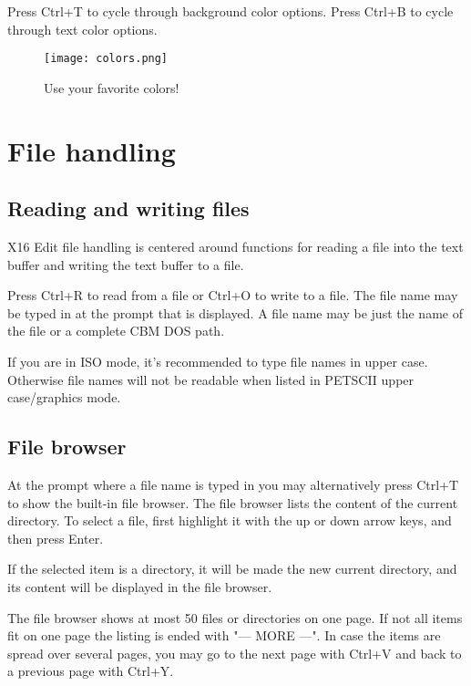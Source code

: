 \documentclass{article}
\begin{document}
        Press Ctrl+T to cycle through background color options.
        Press Ctrl+B to cycle through text color options.

        \begin{figure}[H]
            \caption{Use your favorite colors!}
            \centering\texttt{[image: colors.png]}
        \end{figure}
       
\section{File handling}

    \subsection{Reading and writing files}

    X16 Edit file handling is centered around functions for reading a file into the text buffer and writing
    the text buffer to a file.

    Press Ctrl+R to read from a file or Ctrl+O to write to a file. The file name may 
    be typed in at the prompt that is displayed. A file name may 
    be just the name of the file or a complete CBM DOS path.

    If you are in ISO mode, it's recommended to type file names in upper case. Otherwise file names will not
    be readable when listed in PETSCII upper case/graphics mode.


    \subsection{File browser}

    At the prompt where a file name is typed in you may alternatively press Ctrl+T to show the
    built-in file browser. The file browser lists the content of the current directory. To select a file,
    first highlight it with the up or down arrow keys, and then press Enter.

    If the selected item is a directory, it will be made the new current directory, and its content will
    be displayed in the file browser.

    The file browser shows at most 50 files or directories on one page. If not all items fit on one page 
    the listing is ended with "--- MORE ---". In case the items are spread over several pages, you may go to 
    the next page with Ctrl+V and back to a previous page with Ctrl+Y.
\end{document}
